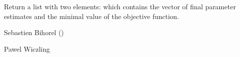 %
\begin{Value}
Return a list with two elements:  which contains the vector
of final parameter estimates and  the minimal value of the
objective function.
\end{Value}
%
\begin{Author}\relax
Sebastien Bihorel ()

Pawel Wiczling
\end{Author}
%
\begin{SeeAlso}\relax
{}
\end{SeeAlso}
